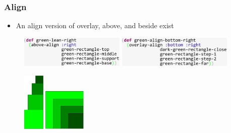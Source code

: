 \documentclass{beamer}
\begin{document}
\begin{frame}
\frametitle{Align}
	\begin{itemize}
		\item An align version of overlay, above, and beside exist
	\end{itemize}
		\begin{figure}
		\includegraphics[width=5cm]{PresentationImages/greenLeanRightCode.pdf}
		\hspace{0.1cm}
		\includegraphics[width=5.5cm]{PresentationImages/greenAlignBottomRightCode.pdf}
	\end{figure}

	\begin{figure}
		\includegraphics[width=1.0cm]{PresentationImages/greenLeanRight.png}
		\hspace{4cm} 	\vspace{0.3cm}
		\includegraphics[width=2cm]{PresentationImages/greenAlignBottomRight.png}
	\end{figure}
\end{frame}
\end{document}
